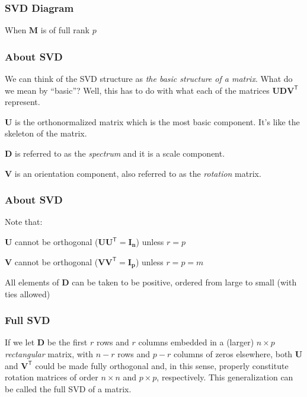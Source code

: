\documentclass[12pt]{beamer}\usepackage[]{graphicx}\usepackage[]{color}
\begin{document}

\begin{frame}
\frametitle{SVD Diagram}
\begin{center}

{\lolit When $\mathbf{M}$ is of full rank $p$}
\end{center}
\end{frame}


\begin{frame}
\frametitle{About SVD}

We can think of the SVD structure as \textit{the basic structure of a matrix}. 
What do we mean by ``basic''? Well, this has to do with what each of the matrices 
$\mathbf{U D V^\mathsf{T}}$ represent.
\eb

\bi
  \item $\mathbf{U}$ is the orthonormalized matrix which is the most basic component. It's like the skeleton of the matrix.
  \item $\mathbf{D}$ is referred to as the \textit{spectrum} and it is a scale component.
  \item $\mathbf{V}$ is an orientation component, also referred to as
  the \textit{rotation} matrix.
\ei

\end{frame}

  
\begin{frame}
\frametitle{About SVD}

Note that: 

\bbi
 \item $\mathbf{U}$ cannot be orthogonal ($\mathbf{U U^\mathsf{T} = I_n}$) unless
$r = p$
 \item $\mathbf{V}$ cannot be orthogonal ($\mathbf{V V^\mathsf{T} = I_p}$) unless $r = p = m$
 \item All elements of $\mathbf{D}$ can be taken to be positive, 
 ordered from large to small (with ties allowed)
\ei

\end{frame}

  
\begin{frame}
\frametitle{Full SVD}

If we let $\mathbf{D}$ be the first $r$ rows and $r$ columns embedded in a (larger)
$n \times p$ \textit{rectangular} matrix, with $n - r$ rows and $p - r$ columns of zeros
elsewhere, both $\mathbf{U}$ and $\mathbf{V^\mathsf{T}}$ could be made fully orthogonal and,
in this sense, properly constitute rotation matrices of order $n \times n$ and $p \times p$,
respectively. This generalization can be called the {\hilit full SVD} of a matrix.

\end{frame}
\end{document}
